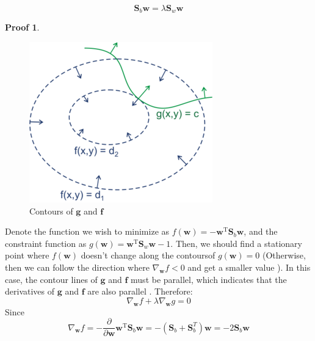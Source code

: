 \documentclass[a4paper,UTF8]{article}
\numberwithin{equation}{section}
\theoremstyle{definition}
\newtheorem*{prove}{Proof}
\begin{document}
\begin{equation}
\label{dual}
\mathbf{S}_b\mathbf{w} = \lambda \mathbf{S}_w\mathbf{w}
\end{equation}
\begin{prove}

\begin{figure}[h]{}
\centering 
\includegraphics[scale=0.6]{1.png}
\caption{Contours of $\mathbf{g}$ and $\mathbf{f}$ }
\end{figure} 
Denote the function we wish to minimize as $f(\mathbf{w}) = -\mathbf{w}^\mathrm{T} \mathbf{S}_b\mathbf{w}$, and the constraint function as  $g(\mathbf{w}) =  \mathbf{w}^\mathrm{T} \mathbf{S}_w\mathbf{w} - 1 $. 
Then, we should find a stationary point where $f(\mathbf{w}) $ doesn't change along the contours\footnotemark  of $g(\mathbf{w}) = 0$ (Otherwise, then we can follow the direction where $\nabla_{\mathbf{w}}f < 0 $ and get a smaller value ).   In this case, the contour lines of $\mathbf{g}$ and $\mathbf{f}$ must be parallel, which indicates that the derivatives of $\mathbf{g}$ and $\mathbf{f}$ are also parallel \footnotemark.  Therefore: 
\begin{equation}
\nabla_{\mathbf{w}} f + \lambda \nabla_{ \mathbf{w}} g = 0
\end{equation}
Since 
\begin{equation}
 \nabla_{\mathbf{w}} f = - \frac{ \partial}{\partial\mathbf{w} }\mathbf{w}^\mathrm{T} \mathbf{S}_b\mathbf{w}  = - (\mathbf{S}_b + \mathbf{S}_b^T) \mathbf{w} = -2 \mathbf{S}_b \mathbf{w} 
 \end{equation}
 

\end{prove}
\end{document}
